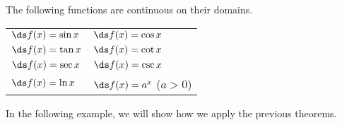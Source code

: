 \begin{theorem}\label{thm:continuous_functions}
The following functions are continuous on their domains.\\
\begin{anywhereenum}
\renewcommand{\arraystretch}{1.4}
\begin{tabular}{ll}
		\item	$\ds f(x) = \sin x$ \hspace{1in}\null&
		\item	$\ds f(x) = \cos x$ \\
		\item	$\ds f(x) = \tan x$ &
		\item	$\ds f(x) = \cot x$ \\
		\item	$\ds f(x) = \sec x$ &
		\item	$\ds f(x) = \csc x$ \\
		\item	$\ds f(x) = \ln x$ &
		\item	$\ds f(x) = a^x$ ($a>0$)
\end{tabular}
\end{anywhereenum}
\end{theorem}

In the following example, we will show how we apply the previous theorems.


